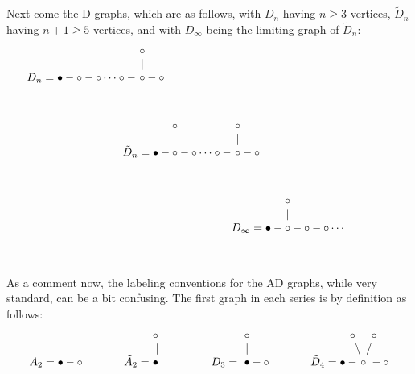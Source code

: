 \documentclass[12pt]{amsbook}
\begin{document}
Next come the D graphs, which are as follows, with $D_n$ having $n\geq3$ vertices, $\tilde{D}_n$ having $n+1\geq5$ vertices, and with $D_\infty$ being the limiting graph of $\tilde{D}_n$:
$$D_n=\bullet-\circ-\circ\dots\circ-
\begin{matrix}\ \circ\\
\ |\\
\ \circ \\
\ \\
\  \end{matrix}-\circ\hskip71mm$$
\vskip-7mm
$$\hskip7mm\tilde{D}_n=\bullet-
\begin{matrix}\circ\\
|\\
\circ\\
\ \\
\ \end{matrix}-\circ\dots\circ-
\begin{matrix}\ \circ\\
\ |\\
\ \circ \\
\ \\
\  \end{matrix}-\circ\hskip18mm$$
\vskip-7mm
$$\hskip50mm D_\infty=\bullet-
\begin{matrix}\circ\\
|\\
\circ\\
\ \\
\ \end{matrix}-\circ-\circ\cdots$$
\vskip-7mm

As a comment now, the labeling conventions for the AD graphs, while very standard, can be a bit confusing. The first graph in each series is by definition as follows:
$$A_2=\bullet-\circ\hskip13mm 
\tilde{A}_2=\begin{matrix}
\circ\\
||\\
\bullet\\
&\\
&\\
\end{matrix}\hskip13mm 
D_3=\begin{matrix}\ \circ\\
\ |\\
\ \bullet \\
\ \\
\  \end{matrix}-\circ \hskip13mm
\tilde{D}_4=\bullet-\!\!\!\!\!\begin{matrix}
\circ\hskip5mm \circ\\
\backslash\ \,\slash\\
\circ\\
&\\
&\\
\end{matrix}\!\!\!\!\!\!\!\!\!\!-\circ$$
\vskip-7mm
\end{document}
